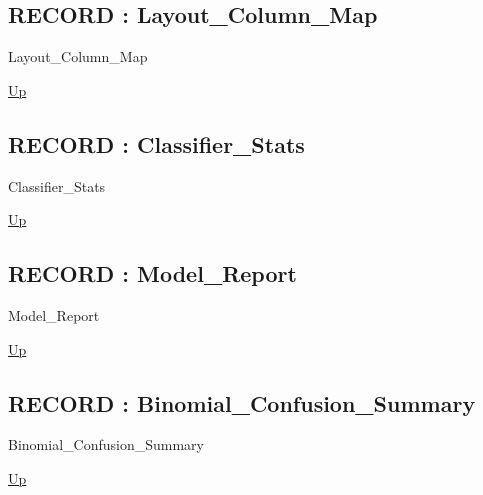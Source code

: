 \par
\par
\subsection*{RECORD : Layout\_Column\_Map}
\hypertarget{ecldoc:logisticregression.types.layout_column_map}{}
\begin{minipage}[t]{\textwidth}
\begin{flushleft}
 Layout\_Column\_Map 
\end{flushleft}
\end{minipage}
\hyperlink{ecldoc:LogisticRegression.Types}{Up}

\par
\par
\subsection*{RECORD : Classifier\_Stats}
\hypertarget{ecldoc:logisticregression.types.classifier_stats}{}
\begin{minipage}[t]{\textwidth}
\begin{flushleft}
 Classifier\_Stats 
\end{flushleft}
\end{minipage}
\hyperlink{ecldoc:LogisticRegression.Types}{Up}

\par
\par
\subsection*{RECORD : Model\_Report}
\hypertarget{ecldoc:logisticregression.types.model_report}{}
\begin{minipage}[t]{\textwidth}
\begin{flushleft}
 Model\_Report 
\end{flushleft}
\end{minipage}
\hyperlink{ecldoc:LogisticRegression.Types}{Up}

\par
\par
\subsection*{RECORD : Binomial\_Confusion\_Summary}
\hypertarget{ecldoc:logisticregression.types.binomial_confusion_summary}{}
\begin{minipage}[t]{\textwidth}
\begin{flushleft}
 Binomial\_Confusion\_Summary 
\end{flushleft}
\end{minipage}
\hyperlink{ecldoc:LogisticRegression.Types}{Up}

